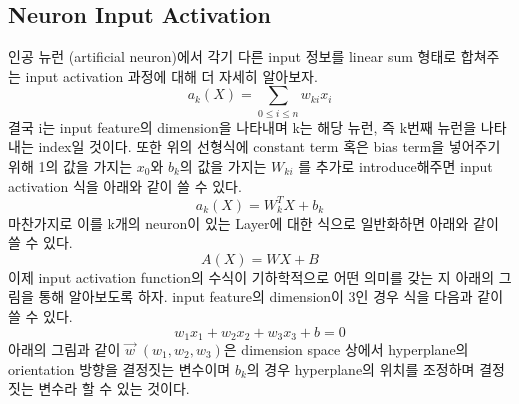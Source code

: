 \documentclass[draft=false]{oblivoir}
\begin{document}
\subsection{Neuron Input Activation}
인공 뉴런 (artificial neuron)에서 각기 다른 input 정보를 linear sum 형태로 합쳐주는 input activation 과정에 대해 더 자세히 알아보자. 
\begin{equation}
a_{k}(X) = \sum_{0 \leq i \leq n}w_{ki}x_{i}
\label{eq:14-2-2}
\end{equation}
결국 i는 input feature의 dimension을 나타내며 k는 해당 뉴런, 즉 k번째 뉴런을 나타내는 index일 것이다. 또한 위의 선형식에 constant term 혹은 bias term을 넣어주기 위해 1의 값을 가지는 $x_{0}$와 $b_{k}$의 값을 가지는 $W_{ki}$ 를 추가로 introduce해주면 input activation 식을 아래와 같이 쓸 수 있다.  
\begin{equation}
a_{k}(X) = W^{T}_{k}X + b_{k}
\label{eq:14-2-3}
\end{equation}
마찬가지로 이를 k개의 neuron이 있는 Layer에 대한 식으로 일반화하면 아래와 같이 쓸 수 있다. 
\begin{equation}
A(X) = WX + B
\label{eq:14-2-4}
\end{equation}
이제 input activation function의 수식이 기하학적으로 어떤 의미를 갖는 지 아래의 그림을 통해 알아보도록 하자. input feature의 dimension이 3인 경우 식을 다음과 같이 쓸 수 있다. 
\begin{equation}
w_{1}x_{1} + w_{2}x_{2} + w_{3}x_{3} + b = 0 
\label{eq:14-2-5}
\end{equation}
아래의 그림과 같이 $\vec{w}$ $(w_{1},w_{2},w_{3})$은 dimension space 상에서  hyperplane의 orientation 방향을 결정짓는 변수이며 $b_{k}$의 경우 hyperplane의 위치를 조정하며 결정짓는 변수라 할 수 있는 것이다.
\end{document}
